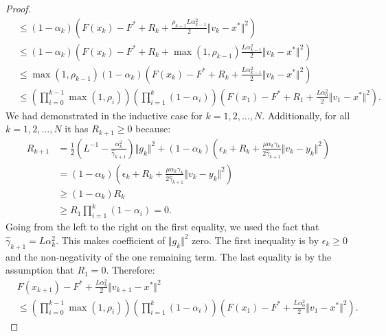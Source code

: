 \documentclass[12pt]{article}
\begin{document}
\begin{proof}
{\begin{align*}
            &\le
            (1 - \alpha_k)
            \left(
                F(x_k) - F^* + R_k + \frac{\rho_{k - 1}L \alpha_{k - 1}^2}{2}\Vert v_k - x^*\Vert^2
            \right)
            \\
            &\le
            (1 - \alpha_k)
            \left(
                F(x_k) - F^* + R_k + \max(1, \rho_{k - 1})\frac{L \alpha_{k - 1}^2}{2}\Vert v_k - x^*\Vert^2
            \right)
            \\
            &\le
            \max(1, \rho_{k - 1})(1 - \alpha_k)
            \left(
                F(x_k) - F^* + R_k + \frac{L \alpha_{k - 1}^2}{2}\Vert v_k - x^*\Vert^2
            \right)
            \\
            &\le
            \left(
                \prod_{i = 0}^{k - 1} \max(1, \rho_{i})
            \right)
            \left(
                \prod_{i = 1}^{k} \left(1  - \alpha_i\right)
            \right)
            \left(
                F(x_1) - F^* + R_1 + \frac{L\alpha_0^2}{2}\Vert v_1 - x^*\Vert^2
            \right).
        \end{align*}
        }
        We had demonstrated in the inductive case for $k=1, 2, \ldots, N$.
        Additionally, for all $k = 1, 2, \ldots, N$ it has $R_{k + 1} \ge 0$ because:
        \begin{align*}
            R_{k + 1}
            &=
            \frac{1}{2}\left(
                L^{-1} - \frac{\alpha_k^2}{\hat \gamma_{k + 1}}
            \right)\Vert g_k\Vert^2
            +
            (1 - \alpha_k)
            \left(
                \epsilon_k + R_k +
                \frac{\mu\alpha_k\gamma_k}{2\hat \gamma_{k + 1}}
                \Vert v_k - y_k\Vert^2
            \right)
            \\
            &= (1 - \alpha_k)
            \left(
                \epsilon_k + R_k
                + \frac{\mu\alpha_k\gamma_k}{2\hat \gamma_{k + 1}}
                \Vert v_k - y_k\Vert^2
            \right)
            \\
            &\ge
            (1 - \alpha_k) R_k
            \\
            &\ge R_1 \prod_{i = 1}^{k} \left(1 - \alpha_i\right) = 0.
        \end{align*}
        Going from the left to the right on the first equality, we used the fact that $\hat \gamma_{k + 1} = L \alpha_{k}^2$.
        This makes coefficient of $\Vert g_k\Vert^2$ zero.
        The first inequality is by $\epsilon_k \ge 0$ and the non-negativity of the one remaining term.
        The last equality is by the assumption that $R_1 = 0$.
        Therefore:
        {\small
        \begin{align*}
            &
            F(x_{k + 1}) - F^* +
            \frac{L\alpha_k^2}{2}\Vert v_{k + 1} - x^*\Vert^2
            \\
            &\le
            \left(
                \prod_{i = 0}^{k - 1} \max(1, \rho_{i})
            \right)
            \left(
                \prod_{i = 1}^{k} \left(1  - \alpha_i\right)
            \right)
            \left(
                F(x_1) - F^* + \frac{L\alpha_0^2}{2}\Vert v_1 - x^*\Vert^2
            \right).
        \end{align*}
        }
    \end{proof}
\end{document}
